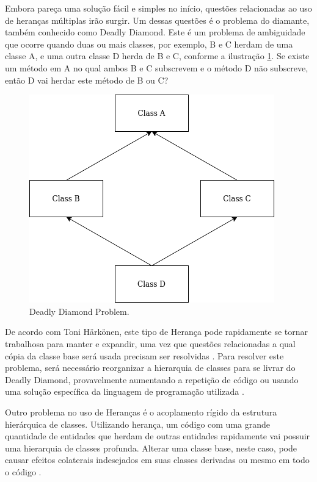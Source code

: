 Embora pareça uma solução fácil e simples no início, questões relacionadas ao uso de heranças múltiplas irão surgir. Um dessas questões é o problema do diamante, também conhecido como Deadly Diamond. Este é um problema de ambiguidade que ocorre quando duas ou mais classes, por exemplo, B e C herdam de uma classe A, e uma outra classe D herda de B e C, conforme a ilustração \ref{fig:deadlyDiamond}. Se existe um método em A no qual ambos B e C subscrevem e o método D não subscreve, então D vai herdar este método de B ou C?

\begin{figure}
\centering
\includegraphics[scale=0.5]{imagens/deadly_diamond.png}
\caption{Deadly Diamond Problem.} 
\label{fig:deadlyDiamond}
\end{figure}

De acordo com Toni Härkönen, este tipo de Herança pode rapidamente se tornar trabalhosa para manter e expandir, uma vez que questões relacionadas a qual cópia da classe base será usada precisam ser resolvidas \cite{advantagesEcs}. Para resolver este problema, será necessário reorganizar a hierarquia de classes para se livrar do Deadly Diamond, provavelmente aumentando a repetição de código ou usando uma solução específica da linguagem de programação utilizada \cite{advantagesEcs}.

Outro problema no uso de Heranças é o acoplamento rígido da estrutura hierárquica de classes. Utilizando herança, um código com uma grande quantidade de entidades que herdam de outras entidades rapidamente vai possuir uma hierarquia de classes profunda. Alterar uma classe base, neste caso, pode causar efeitos colaterais indesejados em suas classes derivadas ou mesmo em todo o código \cite{composition}.

